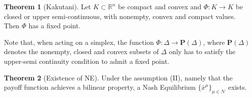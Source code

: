 \documentclass{article}
\theoremstyle{definition}
\newtheorem{theorem}{Theorem}
\newcommand{\agentset}{\mathcal{N}}
\begin{document}
	\begin{theorem}[Kakutani]
		Let $K \subset \mathbb{R}^n$ be compact and convex and $\Phi: K \rightarrow K$ be closed or upper semi-continuous, with nonempty, convex and compact values. Then $\Phi$ has a fixed point.
	\end{theorem}

	Note that, when acting on a simplex, the function $\Phi: \Delta \rightarrow \textbf{P}(\Delta)$, where $\textbf{P}(\Delta)$ denotes the nonempty, closed and convex subsets of $\Delta$ only has to satisfy the upper-semi continuity condition to admit a fixed point.

	\begin{theorem}[Existence of NE]
		Under the assumption (II), namely that the payoff function achieves a bilinear property, a
		Nash Equilibrium $\{\bar{x}^\mu\}_{\mu \in \agentset}$ exists.
	\end{theorem}
\end{document}
